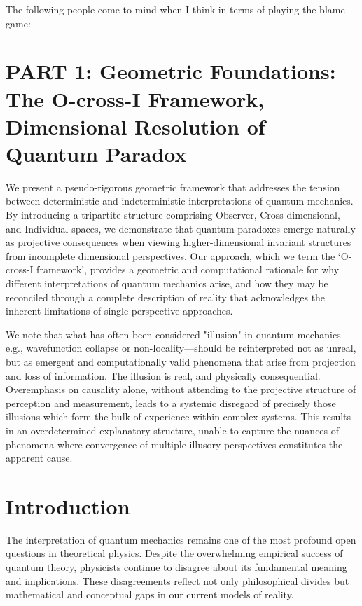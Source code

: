 \documentclass{article}
\begin{document}
The following people come to mind when I think in terms of playing the blame game:\\






\section{PART 1: Geometric Foundations: \\ The O-cross-I Framework, Dimensional Resolution of Quantum Paradox}

We present a pseudo-rigorous geometric framework that addresses the tension between deterministic and indeterministic interpretations of quantum mechanics. By introducing a tripartite structure comprising Observer, Cross-dimensional, and Individual spaces, we demonstrate that quantum paradoxes emerge naturally as projective consequences when viewing higher-dimensional invariant structures from incomplete dimensional perspectives. Our approach, which we term the `O-cross-I framework', provides a geometric and computational rationale for why different interpretations of quantum mechanics arise, and how they may be reconciled through a complete description of reality that acknowledges the inherent limitations of single-perspective approaches.

We note that what has often been considered "illusion" in quantum mechanics—e.g., wavefunction collapse or non-locality—should be reinterpreted not as unreal, but as emergent and computationally valid phenomena that arise from projection and loss of information. The illusion is real, and physically consequential. Overemphasis on causality alone, without attending to the projective structure of perception and measurement, leads to a systemic disregard of precisely those illusions which form the bulk of experience within complex systems. This results in an overdetermined explanatory structure, unable to capture the nuances of phenomena where convergence of multiple illusory perspectives constitutes the apparent cause.

\section*{Introduction}

The interpretation of quantum mechanics remains one of the most profound open questions in theoretical physics. Despite the overwhelming empirical success of quantum theory, physicists continue to disagree about its fundamental meaning and implications. These disagreements reflect not only philosophical divides but mathematical and conceptual gaps in our current models of reality.
\end{document}
